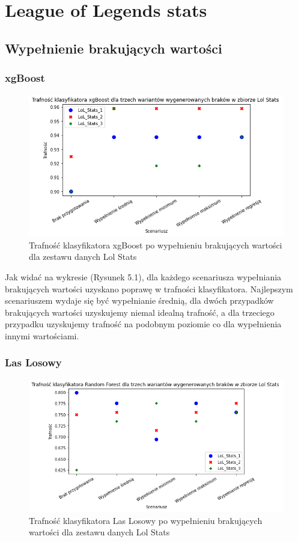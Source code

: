 \documentclass{book}
\begin{document}
\section{League of Legends stats}

\subsection{Wypełnienie brakujących wartości}
\subsubsection{xgBoost}
    \begin{figure}[H]
    \centerline{\includegraphics[scale=0.5]{Lol_stats_xgb_Wypełnienie_brakujących}}
    \centering
    \caption{Trafność klasyfikatora xgBoost po wypełnieniu brakujących wartości dla zestawu danych Lol Stats}
    \end{figure}

    Jak widać na wykresie (Rysunek 5.1), dla każdego scenariusza wypełniania brakujących wartości 
    uzyskano poprawę w trafności klasyfikatora. Najlepszym scenariuszem wydaje się być wypełnianie 
    średnią, dla dwóch przypadków brakujących wartości uzyskujemy niemal idealną trafność, a dla trzeciego 
    przypadku uzyskujemy trafność na podobnym poziomie co dla wypełnienia innymi wartościami.

\subsubsection{Las Losowy}
    \begin{figure}[H]
    \centerline{\includegraphics[scale=0.5]{Lol_stats_rfc_Wypełnienie_brakujących}}
    \centering
    \caption{Trafność klasyfikatora Las Losowy po wypełnieniu brakujących wartości dla zestawu danych Lol Stats}
    \end{figure}
\end{document}
